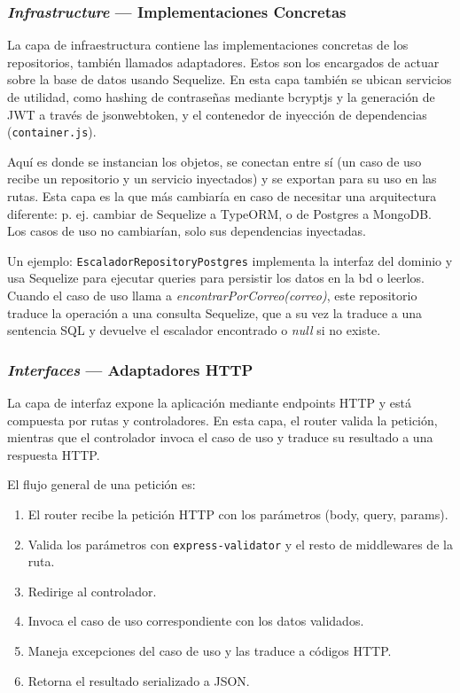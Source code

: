 \subsubsection{\textit{Infrastructure} — Implementaciones Concretas}

La capa de infraestructura contiene las implementaciones concretas de los repositorios, también llamados adaptadores. Estos son
los encargados de actuar sobre la base de datos usando Sequelize. En esta capa también se ubican servicios de utilidad, como
hashing de contraseñas mediante bcryptjs y la generación de JWT a través de jsonwebtoken, y el contenedor de inyección de 
dependencias (\texttt{container.js}). 

Aquí es donde se instancian los objetos, se conectan entre sí (un caso de uso recibe un repositorio y un servicio inyectados) 
y se exportan para su uso en las rutas. Esta capa es la que más cambiaría en caso de necesitar una arquitectura diferente: 
p. ej. cambiar de Sequelize a TypeORM, o de Postgres a MongoDB. Los casos de uso no cambiarían, solo sus dependencias 
inyectadas.

Un ejemplo: \texttt{EscaladorRepositoryPostgres} implementa la interfaz del dominio y usa Sequelize para ejecutar queries 
para persistir los datos en la bd o leerlos. 
Cuando el caso de uso llama a \textit{encontrarPorCorreo(correo)}, este repositorio traduce la operación a una consulta 
Sequelize, que a su vez la traduce a una sentencia SQL y devuelve el escalador encontrado o \textit{null} si no existe.

\subsubsection{\textit{Interfaces} — Adaptadores HTTP}

La capa de interfaz expone la aplicación mediante endpoints HTTP y está compuesta por rutas y controladores. En esta capa,
el router valida la petición, mientras que el controlador invoca el caso de uso y traduce su resultado
a una respuesta HTTP.

El flujo general de una petición es:

\begin{enumerate}
  \item El router recibe la petición HTTP con los parámetros (body, query, params).
  \item Valida los parámetros con \texttt{express-validator} y el resto de middlewares de la ruta.
  \item Redirige al controlador.
  \item Invoca el caso de uso correspondiente con los datos validados.
  \item Maneja excepciones del caso de uso y las traduce a códigos HTTP.
  \item Retorna el resultado serializado a JSON.
\end{enumerate}

